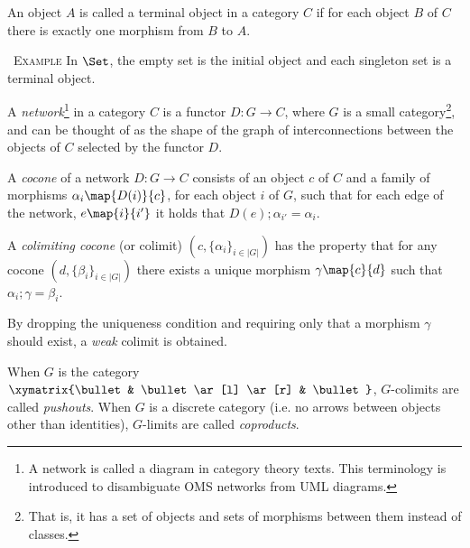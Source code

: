 \documentclass[10pt, a4paper]{isov2}
\renewenvironment{example}[0]{\ \newline \textsc{Example}\quad }{}
\begin{document}
\begin{definition}
An object $A$ is called a terminal object in a category 
$C$ if for each object $B$ of $C$ there is
exactly one morphism from $B$ to $A$.
\end{definition}

\begin{example}
In $\Set$, the empty set is the initial object and each singleton set is a
terminal object.
\end{example}



\label{sec:colimits}

\begin{definition}
A \emph{network}\footnote{A network is called a diagram in category theory texts. This terminology is introduced to disambiguate OMS networks
from UML diagrams.} in a category $C$ is 
a functor $D:G\to C$, where $G$ is a small category\footnote{That is, it has a set of objects and sets of morphisms between them
instead of classes.}, and can be thought of as the shape of the graph of
interconnections between the objects of $C$ selected by the functor $D$. 
\end{definition}

\begin{definition}
A \emph{cocone} of
a network $D:G\to C$ consists of an object $c$ of $C$ and a family of
morphisms $\alpha_i\map{D(i)}{c}$, for each object $i$ of $G$, such that for
each edge of the network, $e\map{i}{i'}$  it holds that 
$D(e);\alpha_{i'} = \alpha_{i}$. 
\end{definition}

\begin{definition}
A \emph{colimiting cocone} (or colimit) $(c, \{\alpha_i\}_{i\in|G|})$ 
has the property that for any 
cocone $(d, \{\beta_i\}_{i\in |G|})$ there exists a unique morphism 
$\gamma\map{c}{d}$ such that $\alpha_i;\gamma = \beta_i$.
 \end{definition}
  By dropping the 
uniqueness condition and requiring only that a morphism $\gamma$ should exist,
 a \emph{weak} colimit is obtained. 

When $G$ is the category $\xymatrix{\bullet & \bullet \ar[l] \ar[r]
& \bullet }$, $G$-colimits are
called  \emph{pushouts}. 
When $G$ is a discrete category (i.e. no arrows between objects other than identities),
 $G$-limits are called \emph{coproducts}.
\end{document}
